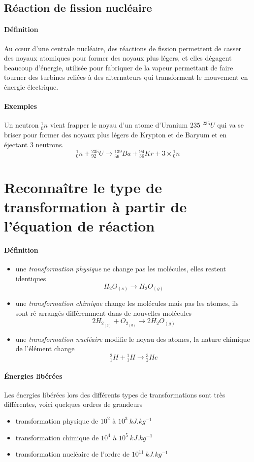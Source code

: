 \subsection{Réaction de fission nucléaire}
\paragraph{Définition} Au cœur d'une centrale nucléaire, des réactions de fission permettent de casser des noyaux atomiques pour former des 
noyaux plus légers, et elles dégagent beaucoup d'énergie, utilisée pour fabriquer de la vapeur permettant de faire tourner des turbines reliées à
des alternateurs qui transforment le mouvement en énergie électrique.
\paragraph{Exemples} Un neutron ${}^1_0n$ vient frapper le noyau d'un atome d'Uranium $235$ ${}^{235}U$ qui va se briser pour former des
noyaux plus légers de Krypton et de Baryum et en éjectant $3$ neutrons.
$$ {}^1_0n + {}^{235}_{92}U \xrightarrow{} {}^{139}_{56}Ba + {}^{94}_{36}Kr + 3 \times {}^1_0n$$

\section{Reconnaître le type de transformation à partir de l'équation de réaction }
\paragraph{Définition}
\begin{itemize}
 \item une \textit{transformation physique} ne change pas les molécules, elles restent identiques
 $$ H_2O_{(s)} \xrightarrow{} H_2O_{(g)}$$
 \item une \textit{transformation chimique} change les molécules mais pas les atomes, ils sont ré-arrangés différemment dans de nouvelles molécules
 $$ 2H_{2_{(g)}} + O_{2_{(g)}} \xrightarrow{} 2 H_2O_{(g)}$$
 \item une \textit{transformation nucléaire} modifie le noyau des atomes, la nature chimique de l'élément change
 $$ {}^2_1H + {}^1_1H \xrightarrow{} {}^3_2He$$
\end{itemize}
\paragraph{Énergies libérées}
Les énergies libérées lors des différents types de transformations sont très différentes, voici quelques ordres de grandeurs
\begin{itemize}
 \item transformation physique de $10^2$ à $10^3 ~kJ.kg^{-1}$
 \item transformation chimique de $10^4$ à $10^5 ~kJ.kg^{-1}$
 \item transformation nucléaire de l'ordre de  $10^{11} ~kJ.kg^{-1}$ 
\end{itemize}
